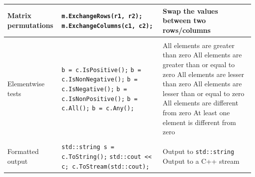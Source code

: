 \documentclass[letterpaper,10pt]{article}
\newcommand{\doublehlinethree}{\hline & & \\ [-10pt] \hline}
\begin{document}
\begin{center}
\begin{tabular}{|p{1.1in}|p{3.1in}|p{2.6in}|}
          Matrix \newline
          permutations
          &
          \texttt{m.ExchangeRows(r1, r2); } \newline
          \texttt{m.ExchangeColumns(c1, c2);}
          &
          Swap the values between two rows/columns
          \\
          \doublehlinethree

          Elementwise tests
          &
          \texttt{b = c.IsPositive();} \newline
          \texttt{b = c.IsNonNegative();} \newline
          \texttt{b = c.IsNegative();} \newline
          \texttt{b = c.IsNonPositive();} \newline
          \texttt{b = c.All();} \newline
          \texttt{b = c.Any();}
          &
          All elements are greater than zero \newline
          All elements are greater than or equal to zero \newline
          All elements are lesser than zero \newline
          All elements are lesser than or equal to zero \newline
          All elements are different from zero \newline
          At least one element is different from zero
          \\
          \doublehlinethree

          Formatted output
          &
          \texttt{std::string s = c.ToString();} \newline
          \texttt{std::cout << c; c.ToStream(std::cout);}
          &
          Output to \texttt{std::string} \newline
          Output to a C++ stream
          \\
          \hline
          
    \end{tabular}
  
  \end{center}



  \newpage
\end{document}
